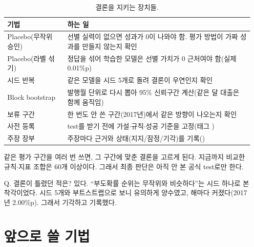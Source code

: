 \begin{table}[H]\centering\small
\begin{tabularx}{\linewidth}{@{}lL@{}}\toprule
기법 & 하는 일\\\midrule
Placebo(무작위 승인) & 선별 실력이 없으면 성과가 0이 나와야 함. 평가 방법이 가짜 성과를 만들지 않는지 확인\\
Placebo(라벨 섞기) & 정답을 섞어 학습한 모델은 선별 가치가 0 근처여야 함(실제 0.01\%p)\\
시드 반복 & 같은 모델을 시드 5개로 돌려 결론이 우연인지 확인\\
Block bootstrap & 발행월 단위로 다시 뽑아 95\% 신뢰구간 계산(같은 달 대출은 함께 움직임)\\
보류 구간 & 한 번도 안 쓴 구간(2017년)에서 같은 방향이 나오는지 확인\\
사전 등록 & test를 받기 전에 가설\ensuremath{\cdot}규칙\ensuremath{\cdot}성공 기준을 고정(태그 )\\
주장 장부 & 주장마다 근거와 상태(지지/잠정/기각)를 기록()\\\bottomrule
\end{tabularx}
\caption{결론을 지키는 장치들.}
\end{table}

\begin{warnbox}
같은 평가 구간을 여러 번 쓰면, 그 구간에 맞춘 결론을 고르게 된다. 지금까지 비교한 규칙\ensuremath{\cdot}지표 조합은 60개 이상이다. 그래서 최종 판단은 아직 안 본 공식 test로만 한다.
\end{warnbox}

\begin{qa}{Q. 결론이 틀렸던 적은?}
있다. ``부도확률 순위는 무작위와 비슷하다''는 시드 하나로 본 착각이었다. 시드 5개와 부트스트랩으로 보니 유의하게 양수였고, 해마다 커졌다(2017년 2.00\%p). 그래서 기각하고 기록했다.
\end{qa}

\chapter{앞으로 쓸 기법}

